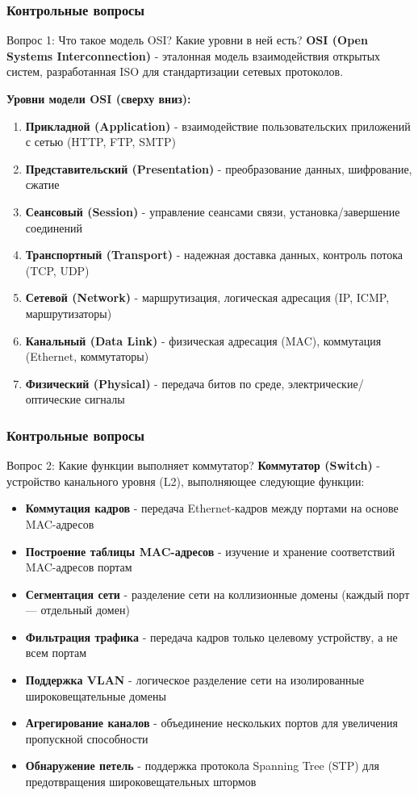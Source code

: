 \begin{frame}
\frametitle{Контрольные вопросы}
\begin{block}{Вопрос 1: Что такое модель OSI? Какие уровни в ней есть?}
\textbf{OSI (Open Systems Interconnection)} - эталонная модель взаимодействия открытых систем, разработанная ISO для стандартизации сетевых протоколов.
\vspace{0.3cm}

\textbf{Уровни модели OSI (сверху вниз):}
\begin{enumerate}
    \item \textbf{Прикладной (Application)} - взаимодействие пользовательских приложений с сетью (HTTP, FTP, SMTP)
    \item \textbf{Представительский (Presentation)} - преобразование данных, шифрование, сжатие
    \item \textbf{Сеансовый (Session)} - управление сеансами связи, установка/завершение соединений
    \item \textbf{Транспортный (Transport)} - надежная доставка данных, контроль потока (TCP, UDP)
    \item \textbf{Сетевой (Network)} - маршрутизация, логическая адресация (IP, ICMP, маршрутизаторы)
    \item \textbf{Канальный (Data Link)} - физическая адресация (MAC), коммутация (Ethernet, коммутаторы)
    \item \textbf{Физический (Physical)} - передача битов по среде, электрические/оптические сигналы
\end{enumerate}
\end{block}
\end{frame}

\begin{frame}
\frametitle{Контрольные вопросы}
\begin{block}{Вопрос 2: Какие функции выполняет коммутатор?}
\textbf{Коммутатор (Switch)} - устройство канального уровня (L2), выполняющее следующие функции:
\vspace{0.2cm}
\begin{itemize}
    \item \textbf{Коммутация кадров} - передача Ethernet-кадров между портами на основе MAC-адресов
    \item \textbf{Построение таблицы MAC-адресов} - изучение и хранение соответствий MAC-адресов портам
    \item \textbf{Сегментация сети} - разделение сети на коллизионные домены (каждый порт — отдельный домен)
    \item \textbf{Фильтрация трафика} - передача кадров только целевому устройству, а не всем портам
    \item \textbf{Поддержка VLAN} - логическое разделение сети на изолированные широковещательные домены
    \item \textbf{Агрегирование каналов} - объединение нескольких портов для увеличения пропускной способности
    \item \textbf{Обнаружение петель} - поддержка протокола Spanning Tree (STP) для предотвращения широковещательных штормов
\end{itemize}
\end{block}
\end{frame}

